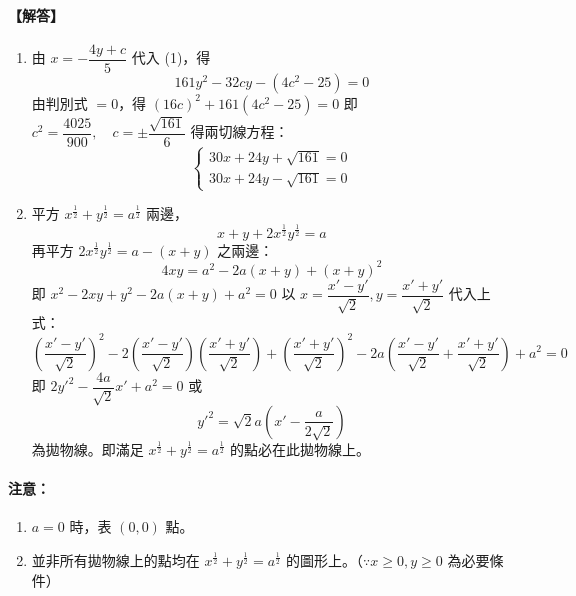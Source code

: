 \paragraph{【解答】}
\begin{enumerate}[label=(\alph*), leftmargin=2em]
  \item 由 $x=-\dfrac{4y+c}{5}$ 代入 (1)，得
  \[ 161y^2 - 32cy - (4c^2-25) = 0 \]
  由判別式 $=0$，得 $(16c)^2 + 161(4c^2-25) = 0$
  即 $c^2 = \dfrac{4025}{900}, \quad c = \pm\dfrac{\sqrt{161}}{6}$
  得兩切線方程：
  \[ \begin{cases} 30x+24y+\sqrt{161}=0 \\ 30x+24y-\sqrt{161}=0 \end{cases} \]
  \item 平方 $x^{\frac{1}{2}} + y^{\frac{1}{2}} = a^{\frac{1}{2}}$ 兩邊，
  \[ x+y+2x^{\frac{1}{2}}y^{\frac{1}{2}} = a \]
  再平方 $2x^{\frac{1}{2}}y^{\frac{1}{2}} = a-(x+y)$ 之兩邊：
  \[ 4xy = a^2 - 2a(x+y) + (x+y)^2 \]
  即 $x^2-2xy+y^2-2a(x+y)+a^2=0$
  以 $x=\dfrac{x'-y'}{\sqrt{2}}, y=\dfrac{x'+y'}{\sqrt{2}}$ 代入上式：
  \[ \left(\dfrac{x'-y'}{\sqrt{2}}\right)^2 - 2\left(\dfrac{x'-y'}{\sqrt{2}}\right)\left(\dfrac{x'+y'}{\sqrt{2}}\right) + \left(\dfrac{x'+y'}{\sqrt{2}}\right)^2 - 2a\left(\dfrac{x'-y'}{\sqrt{2}}+\dfrac{x'+y'}{\sqrt{2}}\right) + a^2 = 0 \]
  即 $2{y'}^2 - \dfrac{4a}{\sqrt{2}}x' + a^2 = 0$
  或
  \[ {y'}^2 = \sqrt{2}a\left(x' - \dfrac{a}{2\sqrt{2}}\right) \]
  為拋物線。即滿足 $x^{\frac{1}{2}} + y^{\frac{1}{2}} = a^{\frac{1}{2}}$ 的點必在此拋物線上。
\end{enumerate}

\paragraph{注意：}
\begin{enumerate}[label=(\arabic*), leftmargin=2em]
  \item $a=0$ 時，表 $(0,0)$ 點。
  \item 並非所有拋物線上的點均在 $x^{\frac{1}{2}} + y^{\frac{1}{2}} = a^{\frac{1}{2}}$ 的圖形上。（$\because x\ge 0, y\ge 0$ 為必要條件）
\end{enumerate}

